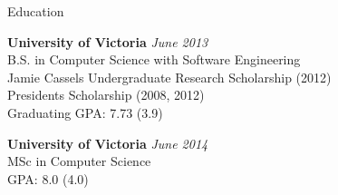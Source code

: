 \documentclass{resume} %
\begin{document}

\begin{rSection}{Education}

{\bf University of Victoria} \hfill {\em June 2013} \\ 
B.S. in Computer Science with Software Engineering \\
Jamie Cassels Undergraduate Research Scholarship (2012) \\
Presidents Scholarship (2008, 2012) \\
Graduating GPA: 7.73 (3.9)

{\bf University of Victoria} \hfill {\em June 2014} \\ 
MSc in Computer Science\\
GPA: 8.0 (4.0)

\end{rSection}

\end{document}
